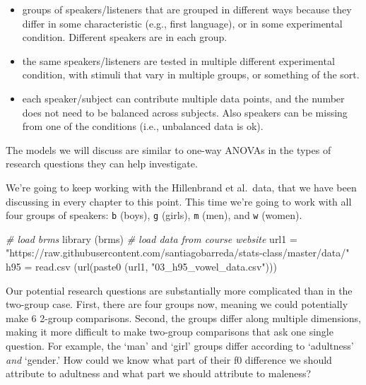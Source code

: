 \documentclass[
]{book}
\newenvironment{Shaded}{\begin{snugshade}}{\end{snugshade}}
\newcommand{\CommentTok}[1]{\textcolor[rgb]{0.56,0.35,0.01}{\textit{#1}}}
\newcommand{\FunctionTok}[1]{\textcolor[rgb]{0.00,0.00,0.00}{#1}}
\newcommand{\NormalTok}[1]{#1}
\newcommand{\OtherTok}[1]{\textcolor[rgb]{0.56,0.35,0.01}{#1}}
\newcommand{\StringTok}[1]{\textcolor[rgb]{0.31,0.60,0.02}{#1}}
\begin{document}
\begin{itemize}
\item
  groups of speakers/listeners that are grouped in different ways because they differ in some characteristic (e.g., first language), or in some experimental condition. Different speakers are in each group.
\item
  the same speakers/listeners are tested in multiple different experimental condition, with stimuli that vary in multiple groups, or something of the sort.
\item
  each speaker/subject can contribute multiple data points, and the number does not need to be balanced across subjects. Also speakers can be missing from one of the conditions (i.e., unbalanced data is ok).
\end{itemize}

The models we will discuss are similar to one-way ANOVAs in the types of research questions they can help investigate.

We're going to keep working with the Hillenbrand et al.~data, that we have been discussing in every chapter to this point. This time we're going to work with all four groups of speakers: \texttt{b} (boys), \texttt{g} (girls), \texttt{m} (men), and \texttt{w} (women).

\begin{Shaded}
\begin{Highlighting}[]
\CommentTok{\# load brms}
\FunctionTok{library}\NormalTok{ (brms)}
\CommentTok{\# load data from course website}
\NormalTok{url1 }\OtherTok{=} \StringTok{"https://raw.githubusercontent.com/santiagobarreda/stats{-}class/master/data/"}
\NormalTok{h95 }\OtherTok{=} \FunctionTok{read.csv}\NormalTok{ (}\FunctionTok{url}\NormalTok{(}\FunctionTok{paste0}\NormalTok{ (url1, }\StringTok{"03\_h95\_vowel\_data.csv"}\NormalTok{)))}
\end{Highlighting}
\end{Shaded}

Our potential research questions are substantially more complicated than in the two-group case. First, there are four groups now, meaning we could potentially make 6 2-group comparisons. Second, the groups differ along multiple dimensions, making it more difficult to make two-group comparisons that ask one single question. For example, the `man' and `girl' groups differ according to `adultness' \emph{and} `gender.' How could we know what part of their f0 difference we should attribute to adultness and what part we should attribute to maleness?
\end{document}

